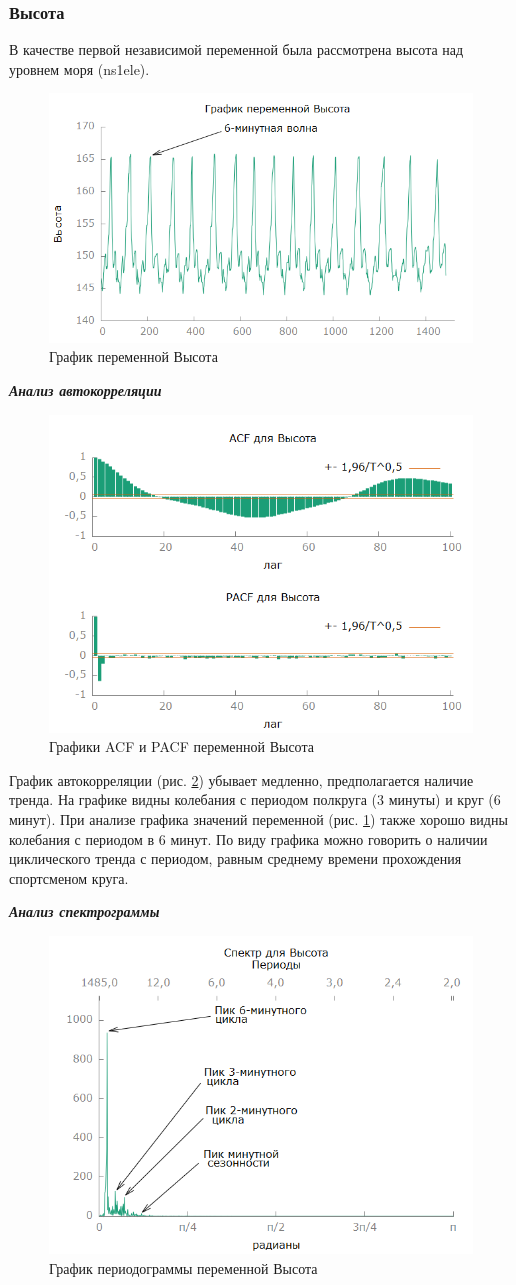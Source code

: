 \documentclass[a4paper,12pt]{article}
\begin{document}
\subsubsection{Высота}

В качестве первой независимой переменной была рассмотрена высота над уровнем моря (ns1ele).
\begin{figure}[H]
	\centering
	\includegraphics[width=0.5\linewidth]{../[graphics]/ele_graph}
	\caption{График переменной Высота}
	\label{fig:ele_graph}
\end{figure}

\textbf{\textit{Анализ автокорреляции}}

\begin{figure}[H]
	\centering
	\includegraphics[width=0.5\linewidth]{../[graphics]/ele_acf_100}
	\caption{Графики ACF и PACF переменной Высота}
	\label{fig:ele_acf_100}
\end{figure}

График автокорреляции (рис. \ref{fig:ele_acf_100}) убывает медленно, предполагается наличие тренда. На графике видны колебания с периодом полкруга (3 минуты) и круг (6 минут). При анализе графика значений переменной (рис. \ref{fig:ele_graph}) также хорошо видны колебания с периодом в 6 минут. По виду графика можно говорить о наличии циклического тренда с периодом, равным среднему времени прохождения спортсменом круга.

\textbf{\textit{Анализ спектрограммы}}

\begin{figure}[H]
	\centering
	\includegraphics[width=0.5\linewidth]{../[graphics]/ele_spectr}
	\caption{График периодограммы переменной Высота}
	\label{fig:ele_spectr}
\end{figure}
\end{document}
